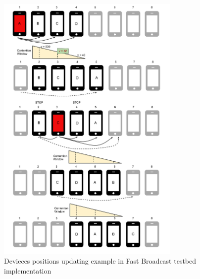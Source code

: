 \begin{figure}[htbp]
\centering
\includegraphics[trim = 10mm 15mm 10mm 10mm ,width=3.5in]{imgs/Positions_1.pdf}
\caption{Devieces positions updating example in Fast Broadcast testbed implementation}
\label{fig:positions}
\end{figure}
